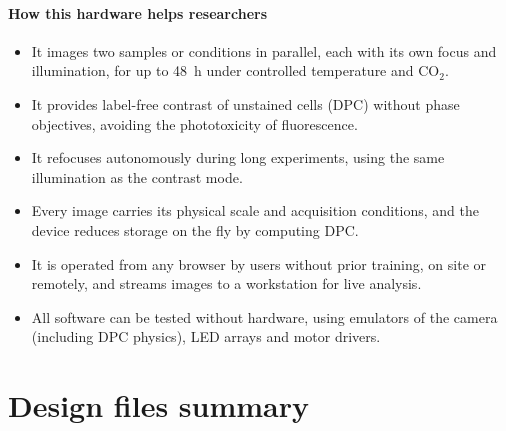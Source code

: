 \documentclass[preprint,12pt]{elsarticle}
\begin{document}
\paragraph{How this hardware helps researchers}
\begin{itemize}
\item It images two samples or conditions in parallel, each with its own
  focus and illumination, for up to 48~h under controlled temperature and
  CO$_2$.
\item It provides label-free contrast of unstained cells (DPC) without
  phase objectives, avoiding the phototoxicity of fluorescence.
\item It refocuses autonomously during long experiments, using the same
  illumination as the contrast mode.
\item Every image carries its physical scale and acquisition conditions,
  and the device reduces storage on the fly by computing DPC.
\item It is operated from any browser by users without prior training, on
  site or remotely, and streams images to a workstation for live analysis.
\item All software can be tested without hardware, using emulators of the
  camera (including DPC physics), LED arrays and motor drivers.
\end{itemize}

\section{Design files summary}
\end{document}
